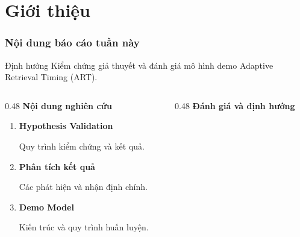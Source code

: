 

\section{Giới thiệu}

\begin{frame}
    \frametitle{Nội dung báo cáo tuần này}

    \begin{block}{Định hướng}
        Kiểm chứng giả thuyết và đánh giá mô hình demo
        Adaptive Retrieval Timing (ART).
    \end{block}

    \vspace{0.3cm}

    \begin{columns}[T,onlytextwidth]

        \begin{column}{0.48\textwidth}
            \textbf{Nội dung nghiên cứu}

            \vspace{0.2cm}

            \begin{enumerate}
                \item \textbf{Hypothesis Validation}

                {\small Quy trình kiểm chứng và kết quả.}

                \vspace{0.25cm}

                \item \textbf{Phân tích kết quả}

                {\small Các phát hiện và nhận định chính.}

                \vspace{0.25cm}

                \item \textbf{Demo Model}

                {\small Kiến trúc và quy trình huấn luyện.}
            \end{enumerate}
        \end{column}

        \begin{column}{0.48\textwidth}
            \textbf{Đánh giá và định hướng}


\end{column}
\end{columns}
\end{frame}
